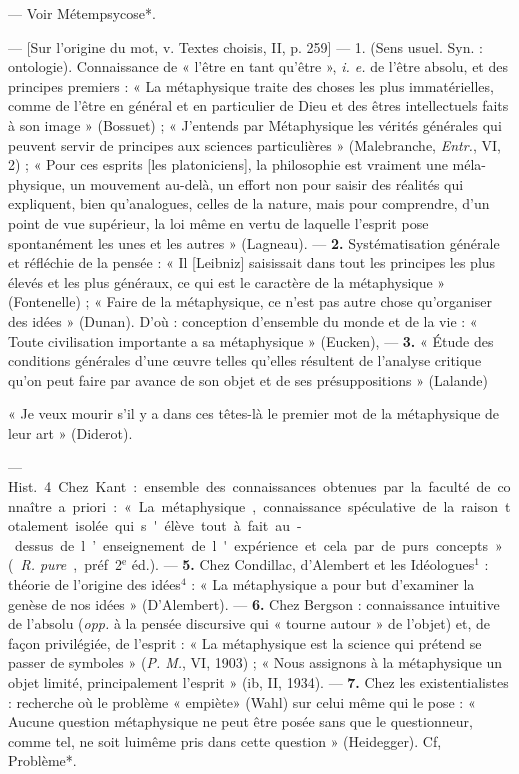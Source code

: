 \begin{itemize}[leftmargin=1cm, label=, itemsep=1pt]
 — Voir Métempsycose*.

 — [Sur l'origine du
mot, v. Textes choisis, II, p. 259] —
1. (Sens usuel. Syn. : ontologie).
Connaissance de « l'être en tant
qu'être », {\it i. e.} de l'être absolu, et des
principes premiers : « La métaphysique traite des choses les plus
immatérielles, comme de l'être en
général et en particulier de Dieu et
des êtres intellectuels faits à son
image » (Bossuet) ; « J'entends par
Métaphysique les vérités générales
qui peuvent servir de principes aux
sciences particulières » (Malebranche,
{\it Entr.}, VI, 2) ; « Pour ces esprits [les
platoniciens], la philosophie est vraiment une méla-physique, un mouvement au-delà, un effort non pour
saisir des réalités qui expliquent,
bien qu’analogues, celles de la nature, mais pour comprendre, d’un
point de vue supérieur, la loi même
en vertu de laquelle l'esprit pose
spontanément les unes et les autres »
(Lagneau). — {\bf 2.} Systématisation
générale et réfléchie de la pensée :
« Il [Leibniz] saisissait dans tout les
principes les plus élevés et les plus
généraux, ce qui est le caractère de
la métaphysique » (Fontenelle) ;
« Faire de la métaphysique, ce n’est
pas autre chose qu'organiser des
idées » (Dunan). D'où : conception
d’ensemble du monde et de la vie :
« Toute civilisation importante a sa
métaphysique » (Eucken), — {\bf 3.}
« Étude des conditions générales
d'une œuvre telles qu’elles résultent
de l'analyse critique qu’on peut
faire par avance de son objet et de
ses présuppositions » (Lalande)

« Je veux mourir s’il y a dans ces
têtes-là le premier mot de la métaphysique de leur art » (Diderot).

— \si{Hist.} 4 Chez Kant : ensemble
des connaissances obtenues par la
faculté de connaître a priori : « La
métaphysique, connaissance spéculative de la raison totalement isolée
qui s'élève tout à fait au-dessus de
l’enseignement de l'expérience et
cela par de purs concepts... »
({\it R. pure}, préf. 2$^\text{e}$ éd.). — {\bf 5.} Chez
Condillac, d’Alembert et les Idéologues$^1$ : théorie de l’origine des
idées$^4$ : « La métaphysique a pour
but d'examiner la genèse de nos
idées » (D’Alembert). — {\bf 6.} Chez
Bergson : connaissance intuitive de
l'absolu ({\it opp.} à la pensée discursive
qui « tourne autour » de l’objet) et,
de façon privilégiée, de l'esprit : « La
métaphysique est la science qui
prétend se passer de symboles »
({\it P. M.}, VI, 1903) ; « Nous assignons
à la métaphysique un objet limité,
principalement l'esprit » (ib, II,
1934). — {\bf 7.} Chez les existentialistes :
recherche où le problème « empiète»
(Wahl) sur celui même qui le pose :
« Aucune question métaphysique ne
peut être posée sans que le questionneur, comme tel, ne soit luimême pris dans cette question »
(Heidegger). Cf, Problème*.


\end{itemize}
